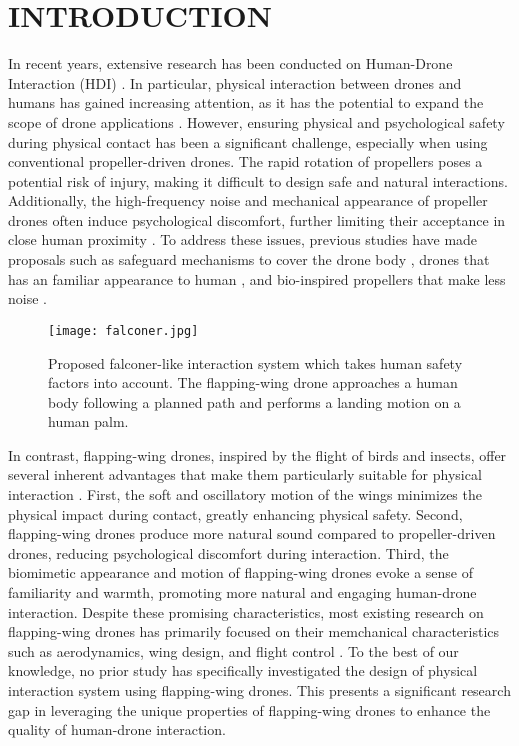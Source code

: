 \section{INTRODUCTION}
In recent years, extensive research has been conducted on Human-Drone Interaction (HDI) \cite{Tezza2019HDI-Survey}.
In particular, physical interaction between drones and humans has gained increasing attention, as it has the potential to expand the scope of drone applications \cite{Knierim2017virtual-reality-tactile-drones, Nitta2014hoverball}. 
However, ensuring physical and psychological safety during physical contact has been a significant challenge, especially when using conventional propeller-driven drones.  
The rapid rotation of propellers poses a potential risk of injury, making it difficult to design safe and natural interactions. 
Additionally, the high-frequency noise and mechanical appearance of propeller drones often induce psychological discomfort, further limiting their acceptance in close human proximity \cite{schaffer2021drone-noise-impact,Yeh2017Proxemics} .
To address these issues, previous studies have made proposals such as 
safeguard mechanisms to cover the drone body \cite{Atahi2017touch-based}, 
drones that has an familiar appearance to human \cite{Yeh2017Proxemics},
and bio-inspired propellers that make less noise \cite{noda2018development-of-low-noise-propeller}.

\begin{figure}
    \centering
    \texttt{[image: falconer.jpg]}
    \caption{Proposed falconer-like interaction system which takes human safety factors into account. 
    The flapping-wing drone approaches a human body following a planned path and performs a landing motion on a human palm.}
    \label{fig:falconer}
\end{figure}

In contrast, flapping-wing drones, inspired by the flight of birds and insects, offer several inherent advantages that make them particularly suitable for physical interaction \cite{de2020flapping}.  
First, the soft and oscillatory motion of the wings minimizes the physical impact during contact, greatly enhancing physical safety.  
Second, flapping-wing drones produce more natural sound compared to propeller-driven drones, reducing psychological discomfort during interaction.  
Third, the biomimetic appearance and motion of flapping-wing drones evoke a sense of familiarity and warmth, promoting more natural and engaging human-drone interaction.  
Despite these promising characteristics, most existing research on flapping-wing drones has primarily focused on their memchanical characteristics such as aerodynamics, wing design, and flight control \cite{billingsley2021aerodynamic,rifai2008flapping-control,chin2020efficient-flapping}.
To the best of our knowledge, no prior study has specifically investigated the design of physical interaction system using flapping-wing drones.  
This presents a significant research gap in leveraging the unique properties of flapping-wing drones to enhance the quality of human-drone interaction.

